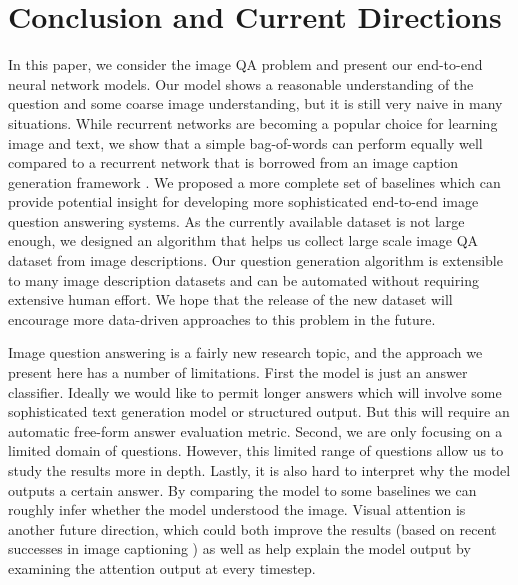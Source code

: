 \documentclass{article} %
\renewcommand{\#}[1]{\textbf{#1}}
\begin{document}
\section{Conclusion and Current Directions}
In this paper, we consider the image QA problem and present our 
end-to-end neural network models. Our model shows a reasonable 
understanding of the question and some coarse image understanding, 
but it is still very naive in many situations. 
While recurrent networks are becoming a popular choice for learning 
image and text, we show that a simple bag-of-words can 
perform equally well compared to a recurrent network that 
is borrowed from an image caption generation framework \cite{vinyals14}. 
We proposed a more complete set of baselines which can 
provide potential insight 
for developing more sophisticated 
end-to-end image question answering systems.
As the currently available dataset is not large enough, 
we designed an algorithm that helps us collect large scale image 
QA dataset from image descriptions. Our question 
generation algorithm is extensible to many image description datasets 
and can be automated without requiring extensive human effort. We 
hope that the release of the new dataset will encourage more 
data-driven approaches to this problem in the future.

Image question answering is a fairly new research topic, and the approach we
present here has a number of limitations. First the model is just an answer
classifier. Ideally we would like to permit longer answers which will involve
some sophisticated text generation model or structured output. But 
this will require an automatic free-form answer evaluation metric. Second, we are 
only focusing on a limited domain of questions. However, this limited range
of questions allow us to study the results more in depth. Lastly, it is also hard to 
interpret why the model outputs a certain
answer. By comparing the model to some baselines we can roughly infer whether 
the model understood the image.
Visual attention is another future direction, which could both 
improve the results (based on recent successes in image captioning \cite{xu15}) 
as well as help explain the model output by examining the attention output at every
timestep.

\end{document}
